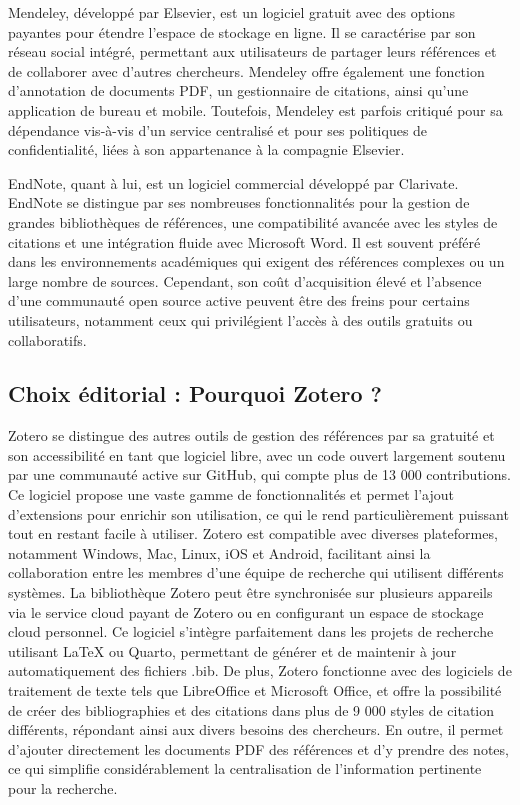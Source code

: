 \documentclass[
  letterpaper,
  DIV=11,
  numbers=noendperiod]{scrreprt}
\begin{document}
Mendeley, développé par Elsevier, est un logiciel gratuit avec des
options payantes pour étendre l'espace de stockage en ligne. Il se
caractérise par son réseau social intégré, permettant aux utilisateurs
de partager leurs références et de collaborer avec d'autres chercheurs.
Mendeley offre également une fonction d'annotation de documents PDF, un
gestionnaire de citations, ainsi qu'une application de bureau et mobile.
Toutefois, Mendeley est parfois critiqué pour sa dépendance vis-à-vis
d'un service centralisé et pour ses politiques de confidentialité, liées
à son appartenance à la compagnie Elsevier.

EndNote, quant à lui, est un logiciel commercial développé par
Clarivate. EndNote se distingue par ses nombreuses fonctionnalités pour
la gestion de grandes bibliothèques de références, une compatibilité
avancée avec les styles de citations et une intégration fluide avec
Microsoft Word. Il est souvent préféré dans les environnements
académiques qui exigent des références complexes ou un large nombre de
sources. Cependant, son coût d'acquisition élevé et l'absence d'une
communauté open source active peuvent être des freins pour certains
utilisateurs, notamment ceux qui privilégient l'accès à des outils
gratuits ou collaboratifs.

\hypertarget{choix-uxe9ditorial-pourquoi-zotero}{%
\subsection{Choix éditorial : Pourquoi Zotero
?}\label{choix-uxe9ditorial-pourquoi-zotero}}

Zotero se distingue des autres outils de gestion des références par sa
gratuité et son accessibilité en tant que logiciel libre, avec un code
ouvert largement soutenu par une communauté active sur GitHub, qui
compte plus de 13 000 contributions. Ce logiciel propose une vaste gamme
de fonctionnalités et permet l'ajout d'extensions pour enrichir son
utilisation, ce qui le rend particulièrement puissant tout en restant
facile à utiliser. Zotero est compatible avec diverses plateformes,
notamment Windows, Mac, Linux, iOS et Android, facilitant ainsi la
collaboration entre les membres d'une équipe de recherche qui utilisent
différents systèmes. La bibliothèque Zotero peut être synchronisée sur
plusieurs appareils via le service cloud payant de Zotero ou en
configurant un espace de stockage cloud personnel. Ce logiciel s'intègre
parfaitement dans les projets de recherche utilisant LaTeX ou Quarto,
permettant de générer et de maintenir à jour automatiquement des
fichiers .bib. De plus, Zotero fonctionne avec des logiciels de
traitement de texte tels que LibreOffice et Microsoft Office, et offre
la possibilité de créer des bibliographies et des citations dans plus de
9 000 styles de citation différents, répondant ainsi aux divers besoins
des chercheurs. En outre, il permet d'ajouter directement les documents
PDF des références et d'y prendre des notes, ce qui simplifie
considérablement la centralisation de l'information pertinente pour la
recherche.
\end{document}

